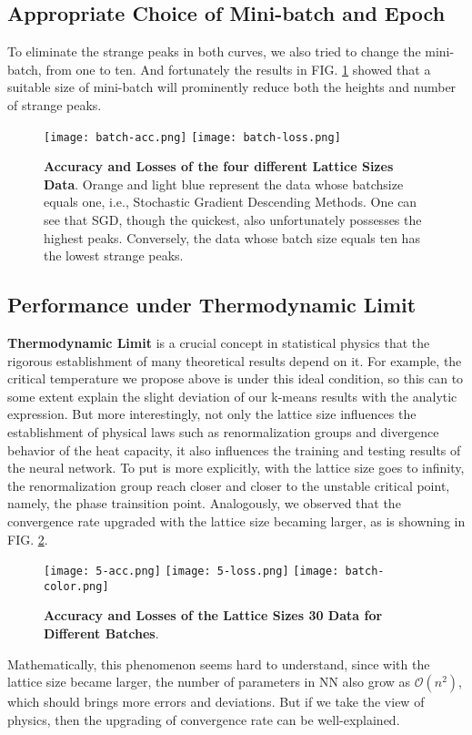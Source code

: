 \documentclass[prl,aps,twocolumn]{revtex4}
\begin{document}
	\subsection{Appropriate Choice of Mini-batch and Epoch}
	To eliminate the strange peaks in both curves, we also tried to change the mini-batch, from one to ten. And fortunately the results in FIG. \ref{fig:3.2} showed that a suitable size of mini-batch will prominently reduce both the heights and number of strange peaks.
	\begin{figure}[!htp]
		\texttt{[image: batch-acc.png]}
		\texttt{[image: batch-loss.png]}
		\caption{{\bf Accuracy and Losses of the four different Lattice Sizes Data}. Orange and light blue represent the data whose batchsize equals one, i.e., Stochastic Gradient Descending Methods. One can see that SGD, though the quickest, also unfortunately possesses the highest peaks. Conversely, the data whose batch size equals ten has the lowest strange peaks.}
		\label{fig:3.2}
	\end{figure}


	\subsection{Performance under Thermodynamic Limit}
		\textbf{Thermodynamic Limit} is a crucial concept in statistical physics that the rigorous establishment of many theoretical results depend on it. For example, the critical temperature we propose above is under this ideal condition, so this can to some extent explain the slight deviation of our k-means results with the analytic expression. But more interestingly, not only the lattice size influences the establishment of physical laws such as renormalization groups and divergence behavior of the heat capacity, it also influences the training and testing results of the neural network. To put is more explicitly, with the lattice size goes to infinity, the renormalization group reach closer and closer to the unstable critical point, namely, the phase trainsition point. Analogously, we observed that the convergence rate upgraded with the lattice size becaming larger, as is showning in FIG. \ref{fig:3.1}.\par
	\begin{figure}[!htp]
		\texttt{[image: 5-acc.png]}
		\texttt{[image: 5-loss.png]}
		\texttt{[image: batch-color.png]}
		\caption{{\bf Accuracy and Losses of the Lattice Sizes 30 Data for Different Batches}.}
		\label{fig:3.1}
	\end{figure}
	Mathematically, this phenomenon seems hard to understand, since with the lattice size became larger, the number of parameters in NN also grow as $\mathcal{O}(n^2)$, which should brings more errors and deviations. But if we take the view of physics, then the upgrading of convergence rate can be well-explained.



\end{document}
